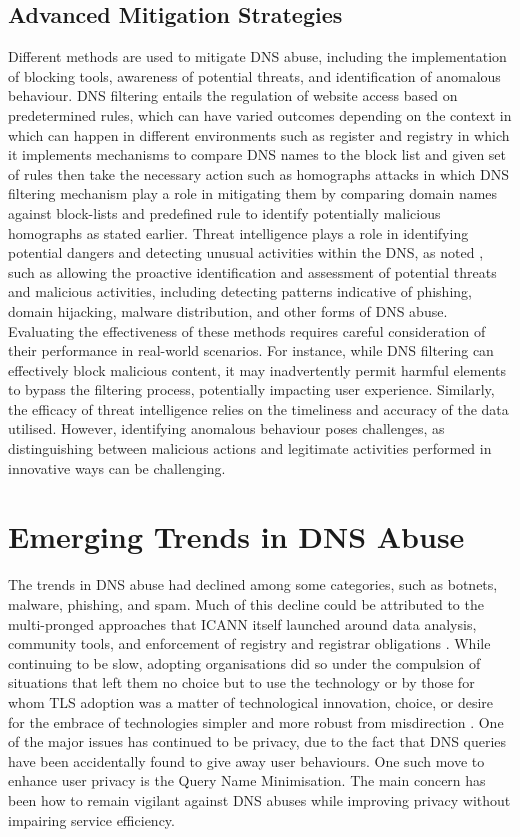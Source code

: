 \subsection{Advanced Mitigation Strategies}

Different methods are used to mitigate DNS abuse, including the implementation of blocking tools, awareness of potential threats, and identification of anomalous behaviour. DNS filtering entails the regulation of website access based on predetermined rules, which can have varied outcomes depending on the context in which can happen in different environments such as register and registry in which it implements mechanisms to compare DNS names to the block list and given set of rules then take the necessary action such as homographs attacks in which DNS filtering mechanism play a role in mitigating them by comparing domain names against block-lists and predefined rule to identify potentially malicious homographs as stated earlier. Threat intelligence plays a role in identifying potential dangers and detecting unusual activities within the DNS, as noted \cite{rizvi2022application}, such as allowing the proactive identification and assessment of potential threats and malicious activities, including detecting patterns indicative of phishing, domain hijacking, malware distribution, and other forms of DNS abuse. Evaluating the effectiveness of these methods requires careful consideration of their performance in real-world scenarios. For instance, while DNS filtering can effectively block malicious content, it may inadvertently permit harmful elements to bypass the filtering process, potentially impacting user experience. Similarly, the efficacy of threat intelligence relies on the timeliness and accuracy of the data utilised. However, identifying anomalous behaviour poses challenges, as distinguishing between malicious actions and legitimate activities performed in innovative ways can be challenging.


\section{Emerging Trends in DNS Abuse}

The trends in DNS abuse had declined among some categories, such as botnets, malware, phishing, and spam. Much of this decline could be attributed to the multi-pronged approaches that ICANN itself launched around data analysis, community tools, and enforcement of registry and registrar obligations \cite{icann_dns_security_threat}. While continuing to be slow, adopting organisations did so under the compulsion of situations that left them no choice but to use the technology or by those for whom TLS adoption was a matter of technological innovation, choice, or desire for the embrace of technologies simpler and more robust from misdirection \cite{circleid_dns_trends_future}. One of the major issues has continued to be privacy, due to the fact that DNS queries have been accidentally found to give away user behaviours. One such move to enhance user privacy is the Query Name Minimisation. The main concern has been how to remain vigilant against DNS abuses while improving privacy without impairing service efficiency.

